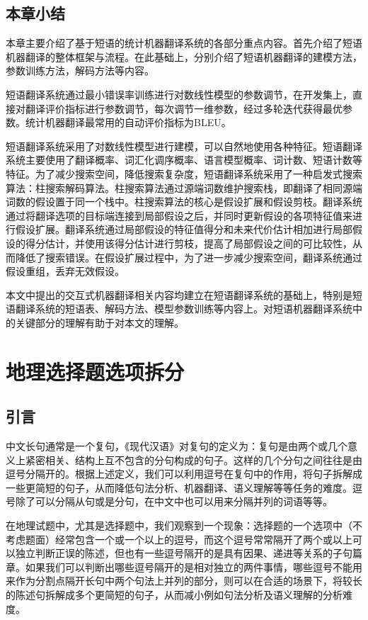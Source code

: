 \documentclass[master, winfont]{njuthesis}
\begin{document}
\section{本章小结}
本章主要介绍了基于短语的统计机器翻译系统的各部分重点内容。首先介绍了短语机器翻译的整体框架与流程。在此基础上，分别介绍了短语机器翻译的建模方法，参数训练方法，解码方法等内容。

短语翻译系统通过最小错误率训练进行对数线性模型的参数调节，在开发集上，直接对翻译评价指标进行参数调节，每次调节一维参数，经过多轮迭代获得最优参数。统计机器翻译最常用的自动评价指标为BLEU。

短语翻译系统采用了对数线性模型进行建模，可以自然地使用各种特征。短语翻译系统主要使用了翻译概率、词汇化调序概率、语言模型概率、词计数、短语计数等特征。为了减少搜索空间，降低搜索复杂度，短语翻译系统采用了一种启发式搜索算法：柱搜索解码算法。柱搜索算法通过源端词数维护搜索栈，即翻译了相同源端词数的假设置于同一个栈中。柱搜索算法的核心是假设扩展和假设剪枝。翻译系统通过将翻译选项的目标端连接到局部假设之后，并同时更新假设的各项特征值来进行假设扩展。翻译系统通过局部假设的特征值得分和未来代价估计相加进行局部假设的得分估计，并使用该得分估计进行剪枝，提高了局部假设之间的可比较性，从而降低了搜索错误。在假设扩展过程中，为了进一步减少搜索空间，翻译系统通过假设重组，丢弃无效假设。

本文中提出的交互式机器翻译相关内容均建立在短语翻译系统的基础上，特别是短语翻译系统的短语表、解码方法、模型参数训练等内容上。对短语机器翻译系统中的关键部分的理解有助于对本文的理解。

\chapter{地理选择题选项拆分}
\label{chapter:split}
\section{引言}
中文长句通常是一个复句，《现代汉语》对复句的定义为：复句是由两个或几个意义上紧密相关、结构上互不包含的分句构成的句子\cite{zhou2008}。这样的几个分句之间往往是由逗号分隔开的。根据上述定义，我们可以利用逗号在复句中的作用，将句子拆解成一些更简短的句子，从而降低句法分析、机器翻译、语义理解等等任务的难度。逗号除了可以分隔从句或是分句，在中文中也可以用来分隔并列的词语等等。

在地理试题中，尤其是选择题中，我们观察到一个现象：选择题的一个选项中（不考虑题面）经常包含一个或一个以上的逗号，而这个逗号常常隔开了两个或以上可以独立判断正误的陈述，但也有一些逗号隔开的是具有因果、递进等关系的子句篇章。如果我们可以判断出哪些逗号隔开的是相对独立的两件事情，哪些逗号不能用来作为分割点隔开长句中两个句法上并列的部分，则可以在合适的场景下，将较长的陈述句拆解成多个更简短的句子，从而减小例如句法分析及语义理解的分析难度。
\end{document}
